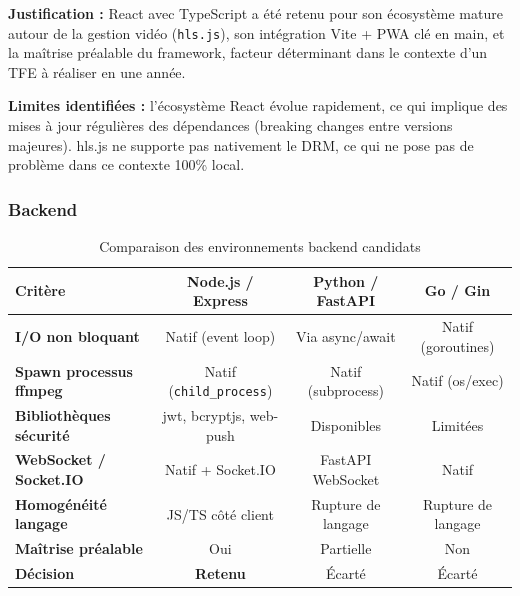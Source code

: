 \documentclass[12pt,a4paper]{article}
\begin{document}
\begin{infobox}
\textbf{Justification :} React avec TypeScript a été retenu pour son écosystème mature autour de la gestion vidéo (\texttt{hls.js}), son intégration Vite + PWA clé en main, et la maîtrise préalable du framework, facteur déterminant dans le contexte d'un TFE à réaliser en une année.
\end{infobox}

\begin{warnbox}
\textbf{Limites identifiées :} l'écosystème React évolue rapidement, ce qui implique des mises à jour régulières des dépendances (breaking changes entre versions majeures). hls.js ne supporte pas nativement le DRM, ce qui ne pose pas de problème dans ce contexte 100\% local.
\end{warnbox}


\subsubsection{Backend}

\begin{table}[H]
\centering
\small
\renewcommand{\arraystretch}{1.3}
\begin{tabular}{|l|c|c|c|}
\hline
\textbf{Critère} & \textbf{Node.js / Express} & \textbf{Python / FastAPI} & \textbf{Go / Gin} \\
\hline
\textbf{I/O non bloquant} & Natif (event loop) & Via async/await & Natif (goroutines) \\
\hline
\textbf{Spawn processus ffmpeg} & Natif (\texttt{child\_process}) & Natif (subprocess) & Natif (os/exec) \\
\hline
\textbf{Bibliothèques sécurité} & jwt, bcryptjs, web-push & Disponibles & Limitées \\
\hline
\textbf{WebSocket / Socket.IO} & Natif + Socket.IO & FastAPI WebSocket & Natif \\
\hline
\textbf{Homogénéité langage} & JS/TS côté client & Rupture de langage & Rupture de langage \\
\hline
\textbf{Maîtrise préalable} & Oui & Partielle & Non \\
\hline
\textbf{Décision} & \textcolor{green!60!black}{\textbf{Retenu}} & Écarté & Écarté \\
\hline
\end{tabular}
\caption{Comparaison des environnements backend candidats}
\end{table}
\end{document}
